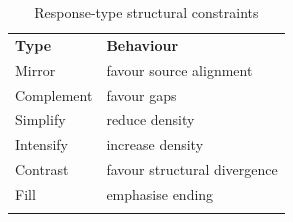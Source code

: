 \begin{longtable}[]{@{}
  >{\raggedright\arraybackslash}p{}
  >{\raggedright\arraybackslash}p{}@{}}
\caption{Response-type structural constraints}\label{tab:response-type-constraints}\\
\toprule\noalign{}
\begin{minipage}[b]{\linewidth}\centering
\textbf{Type}
\end{minipage} & \begin{minipage}[b]{\linewidth}\centering
\textbf{Behaviour}
\end{minipage} \\
\begin{minipage}[b]{\linewidth}\raggedright
Mirror
\end{minipage} & \begin{minipage}[b]{\linewidth}\raggedright
favour source alignment
\end{minipage} \\
\begin{minipage}[b]{\linewidth}\raggedright
Complement
\end{minipage} & \begin{minipage}[b]{\linewidth}\raggedright
favour gaps
\end{minipage} \\
\begin{minipage}[b]{\linewidth}\raggedright
Simplify
\end{minipage} & \begin{minipage}[b]{\linewidth}\raggedright
reduce density
\end{minipage} \\
\begin{minipage}[b]{\linewidth}\raggedright
Intensify
\end{minipage} & \begin{minipage}[b]{\linewidth}\raggedright
increase density
\end{minipage} \\
\begin{minipage}[b]{\linewidth}\raggedright
Contrast
\end{minipage} & \begin{minipage}[b]{\linewidth}\raggedright
favour structural divergence
\end{minipage} \\
\begin{minipage}[b]{\linewidth}\raggedright
Fill
\end{minipage} & \begin{minipage}[b]{\linewidth}\raggedright
emphasise ending
\end{minipage} \\
\midrule\noalign{}
\endhead
\bottomrule\noalign{}
\endlastfoot
\end{longtable}


